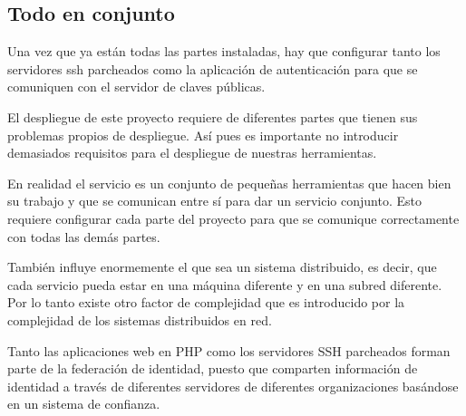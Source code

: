     
\subsection{Todo en conjunto}

    Una vez que ya están todas las partes instaladas, hay que
    configurar tanto los servidores ssh parcheados como la
    aplicación de autenticación para que se comuniquen con el
    servidor de claves públicas.

    El despliegue de este proyecto requiere de diferentes partes que
    tienen sus problemas propios de despliegue. Así pues es importante
    no introducir demasiados requisitos para el despliegue de nuestras
    herramientas.

    En realidad el servicio es un conjunto de pequeñas herramientas
    que hacen bien su trabajo y que se comunican entre sí para dar un
    servicio conjunto. Esto requiere configurar cada parte del
    proyecto para que se comunique correctamente con todas las demás
    partes.

    También influye enormemente el que sea un sistema distribuido, es
    decir, que cada servicio pueda estar en una máquina diferente y en
    una subred diferente. Por lo tanto existe otro factor de
    complejidad que es introducido por la complejidad de los sistemas
    distribuidos en red.

    Tanto las aplicaciones web en PHP como los servidores SSH
    parcheados forman parte de la federación de identidad, puesto que
    comparten información de identidad a través de diferentes
    servidores de diferentes organizaciones basándose en un sistema de
    confianza.
